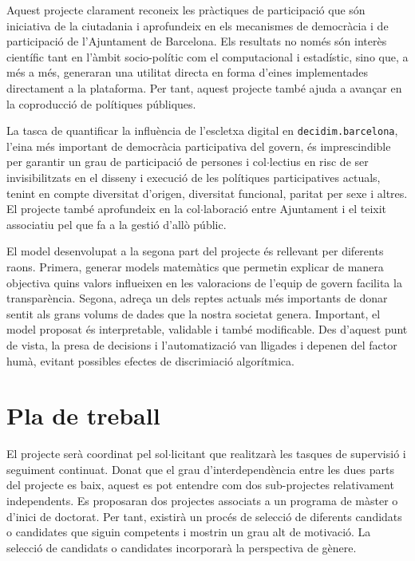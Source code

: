 \documentclass[final,10pt]{article}
\begin{document}
Aquest projecte clarament reconeix les pr\`actiques de participaci\'o que s\'on iniciativa de la ciutadania i aprofundeix en els mecanismes de democr\`acia i de
participaci\'o de l'Ajuntament de Barcelona.
Els resultats no nom\'es s\'on inter\`es cient\'ific tant en l'\`ambit socio-pol\'itic com el computacional i estad\'istic, sino que, a m\'es a m\'es, generaran una utilitat directa en forma d'eines implementades directament a la plataforma. Per tant, 
aquest projecte tamb\'e ajuda a avan\c{c}ar en la coproducci\'o de pol\'itiques públiques.

La tasca de quantificar la influ\`encia de l'escletxa digital en \texttt{decidim.barcelona}, l'eina m\'es important de democr\`acia participativa del govern, \'es imprescindible per garantir un grau de participaci\'o de persones i col$\cdot$lectius en risc de ser invisibilitzats en el disseny i execuci\'o de les pol\'itiques participatives actuals, tenint en compte diversitat d'origen, diversitat funcional, paritat per sexe i altres.
%
El projecte tamb\'e aprofundeix en la col$\cdot$laboraci\'o entre Ajuntament i el teixit associatiu pel que fa a la gesti\'o d'all\`o p\'ublic.

El model desenvolupat a la segona part del projecte \'es rellevant per diferents raons.
Primera, generar models matem\`atics que permetin explicar de manera objectiva quins valors influeixen en les valoracions de l'equip de govern facilita la transpar\`encia.
Segona, adre\c{c}a un dels reptes actuals m\'es importants de donar sentit als grans volums de dades que la nostra societat genera.
Important, el model proposat \'es interpretable, validable i tamb\'e modificable. Des d'aquest punt de vista, la presa de decisions i l'automatizaci\'o van lligades i depenen del factor hum\`a, evitant possibles efectes de discrimiaci\'o algor\'itmica.

\section{Pla de treball}
El projecte ser\`a coordinat pel sol$\cdot$licitant que realitzar\`a les tasques de supervisi\'o i seguiment continuat. Donat que el grau d'interdepend\`encia entre les dues parts del projecte es baix, aquest es pot entendre com dos sub-projectes relativament independents. Es proposaran dos projectes associats a un programa de m\`aster o d'inici de doctorat.
Per tant, existir\`a un proc\'es de selecci\'o de diferents candidats o candidates que siguin competents i mostrin un grau alt de motivaci\'o. La selecci\'o de candidats o candidates incorporar\`a la perspectiva de g\`enere.
\end{document}
